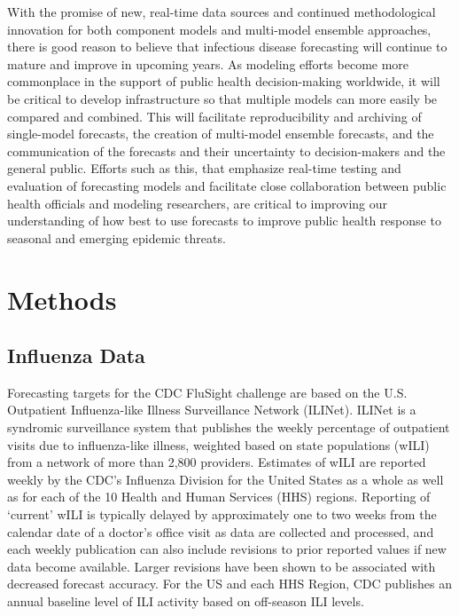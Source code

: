 \documentclass{article}\usepackage[]{graphicx}\usepackage[]{color}
\begin{document}
With the promise of new, real-time data sources and continued methodological innovation for both component models and multi-model ensemble approaches, there is good reason to believe that infectious disease forecasting will continue to mature and improve in upcoming years.
As modeling efforts become more commonplace in the support of public health decision-making worldwide, it will be critical to develop infrastructure so that multiple models can more easily be compared and combined.
This will facilitate reproducibility and archiving of single-model forecasts, the creation of multi-model ensemble forecasts, and the communication of the forecasts and their uncertainty to decision-makers and the general public.
Efforts such as this, that emphasize real-time testing and evaluation of forecasting models and facilitate close collaboration between public health officials and modeling researchers, are critical to improving our understanding of how best to use forecasts to improve public health response to seasonal and emerging epidemic threats.


\section{Methods}

\subsection{Influenza Data}
Forecasting targets for the CDC FluSight challenge are based on the U.S. Outpatient Influenza-like Illness Surveillance Network (ILINet). 
ILINet is a syndromic surveillance system that publishes the weekly percentage of outpatient visits due to influenza-like illness, weighted based on state populations (wILI) from a network of more than 2,800 providers. 
Estimates of wILI are reported weekly by the CDC's Influenza Division for the United States as a whole as well as for each of the 10 Health and Human Services (HHS) regions. 
Reporting of `current' wILI is typically delayed by approximately one to two weeks from the calendar date of a doctor's office visit as data are collected and processed, and each weekly publication can also include revisions to prior reported values if new data become available. 
Larger revisions have been shown to be associated with decreased forecast accuracy.\cite{Reich2018}
For the US and each HHS Region, CDC publishes an annual baseline level of ILI activity based on off-season ILI levels.\cite{surv2017} 
\end{document}
